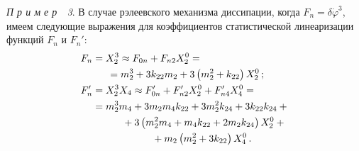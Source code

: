 \begin{multicols}{2}
 \textit{ П р и м е р~~3\/}. В случае рэлеевского механизма диссипации, когда $F_n
=\delta\dot\varphi^3$, имеем следующие выражения для коэффициентов
статистической линеаризации функций $F_n$ и $F_n'$:
\begin{align}
 F_n &= X_2^3 \approx F_{0n} + F_{n2} X_2^0 ={}\notag \\
 &\hspace*{15pt}{}=m_2^3 + 3 k_{22} m_2 + 3\left( m_2^2 + k_{22}\right) X_2^0\,;\label{e27}\\
 F_n' &= X_2^3 X_4 \approx F_{0n}' + F_{n2}' X_2^0 + F_{n4}' X_4^0 ={}\notag\\
 &{}= m_2^3 m_4 + 3 m_2 m_4 k_{22} + 3 m_2^2 k_{24} + 3 k_{22} k_{24} +{}\notag\\
 &\hspace*{30pt}{}+ 3\left(m_2^2 m_4 + m_4 k_{22} + 2 m_2 k_{24}\right) X_2^0 +{}\notag\\
&\hspace*{60pt}{}+ m_2 \left(m_2^2 + 3 k_{22}\right) X_4^0\,.\label{e28}
\end{align}


\end{multicols}
